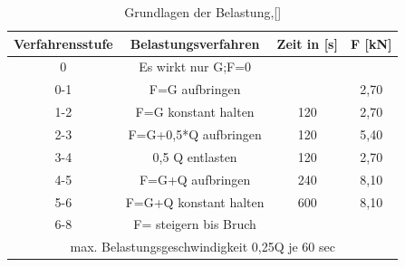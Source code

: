 \begin{table}
\caption{Grundlagen der Belastung,[]}
\begin{center}
\begin{tabular}{|c|c|c|c|}
\hline 
Verfahrensstufe & Belastungsverfahren & Zeit in [s] & F [kN] \\ 
\hline \hline
0 & Es wirkt nur G;F=0 &  &  \\ 
\hline 
0-1 & F=G aufbringen &  & 2,70 \\ 
\hline 
1-2 & F=G konstant halten & 120 & 2,70 \\ 
\hline 
2-3 & F=G+0,5*Q aufbringen & 120 & 5,40 \\ 
\hline 
3-4 & 0,5 Q entlasten & 120 & 2,70 \\ 
\hline 
4-5 & F=G+Q aufbringen & 240 & 8,10 \\ 
\hline 
5-6 & F=G+Q konstant halten & 600 & 8,10 \\ 
\hline 
6-8 & F= steigern bis Bruch &  &  \\ 
\hline \hline
\multicolumn{4}{|c|}{ max. Belastungsgeschwindigkeit 0,25Q je 60 sec} \\ 
\hline 
\end{tabular} 
\label{tab:belastung}
\end{center}
\end{table}